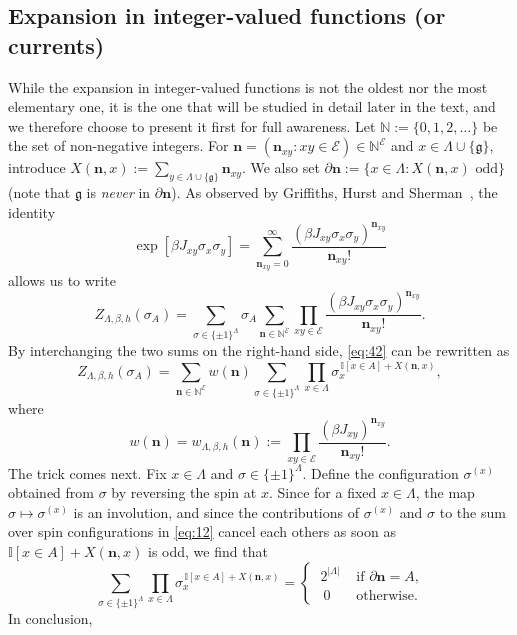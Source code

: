 \documentclass[a4paper,oneside,11pt]{article}
\newcommand{\ee}{\end{equation}}
\newcommand{\be}{\begin{equation}}
\begin{document}
\subsection{Expansion in integer-valued functions (or currents)}\label{sec:current} While the expansion in integer-valued functions is not the oldest nor the most elementary one, it is the one that will be studied in detail later in the text, and we therefore choose to present it first for full awareness. Let $\mathbb N:=\{0,1,2,\dots\}$ be the set of non-negative integers.
For $\mathbf n=(\mathbf n_{xy}:xy\in\mathcal E)\in \mathbb N^{\mathcal E}$ and $x\in \Lambda\cup\{\mathfrak g\}$, introduce $X(\mathbf n,x):=\sum_{y\in \Lambda\cup\{\mathfrak g\}}\mathbf n_{xy}$. We also set 
$\partial \mathbf n:=\{x\in \Lambda:X(\mathbf n,x)\text{ odd}\}
$ (note that $\mathfrak g$ is {\em never} in $\partial\mathbf n$).
As observed by Griffiths, Hurst and Sherman~\cite{GriHurShe70}, the identity
\be\label{eq:41}\exp[\beta J_{xy} \sigma_x\sigma_y]=\sum_{{\mathbf n}_{xy}=0}^\infty\frac{(\beta J_{xy}\sigma_x\sigma_y)^{{\mathbf n}_{xy}} }{{\mathbf n}_{xy}!}\ee
allows us to write
\be\label{eq:42}
Z_{\Lambda,\beta,h}(\sigma_A)=\sum_{\sigma\in\{\pm1\}^\Lambda}\sigma_A\sum_{{\mathbf n}\in \mathbb N^{\mathcal E}}\prod_{xy\in \mathcal E}\frac{(\beta J_{xy}\sigma_x\sigma_y)^{{\mathbf n}_{xy}} }{{\mathbf n}_{xy}!}.
\ee
By interchanging the two sums on the right-hand side, \eqref{eq:42} can be rewritten as
\be\label{eq:12}
Z_{\Lambda,\beta,h}(\sigma_A)=\sum_{{\mathbf n}\in \mathbb N^{\mathcal E}}w(\mathbf n)\sum_{\sigma\in\{\pm1\}^\Lambda}\prod_{x\in \Lambda}\sigma_x^{\,\mathbb{I}[x\in A]+X(\mathbf n,x)},
\ee
where 
\be\nonumber
w(\mathbf n)=w_{\Lambda,\beta,h}(\mathbf n):=\prod_{xy\in \mathcal E}\frac{\displaystyle(\beta J_{xy})^{{\mathbf n}_{xy}}}{{\mathbf n}_{xy}!}.
\ee
The trick comes next.
Fix $x\in \Lambda$ and $\sigma\in\{\pm1\}^\Lambda$. Define the configuration $\sigma^{(x)}$ obtained from $\sigma$ by reversing the spin at $x$. Since for a fixed $x\in\Lambda$, the map $\sigma\mapsto \sigma^{(x)}$ is an involution, and since the contributions of $\sigma^{(x)}$ and $\sigma$ to the sum over spin configurations in \eqref{eq:12} cancel each others as soon as $\mathbb{I}[x\in A]+X(\mathbf n,x)$ is odd, we find that
\be\label{eq:pm1trick}\sum_{\sigma\in\{\pm1\}^{\Lambda}}\prod_{x\in \Lambda}\sigma_x^{\,\mathbb{I}[x\in A]+X(\mathbf n,x)}=\begin{cases}\ 2^{|\Lambda|} &\text{ if $\partial \mathbf n=A$,}\\ \ \ 0&\text{ otherwise.}\end{cases}\ee
In conclusion,
\end{document}
